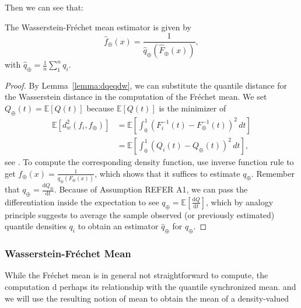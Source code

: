 Then we can see that:
\begin{lemma}
    The Wasserstein-Fréchet mean estimator is given by
    \begin{equation}
        \hat{f}_\oplus(x) = \frac{1}{\hat{q}_\oplus(\hat{F}_\oplus(x))},
    \end{equation}
    with $\hat{q}_\oplus = \frac{1}{n} \sum_{1}^{n} q_i$.
\end{lemma}
\begin{proof}
    By Lemma~\ref{lemma:dqeqdw}, we can substitute the quantile distance for the
    Wasserstein distance in the computation of the Fréchet mean. We set
    $Q_\oplus(t) = \mathbb{E}[Q(t)]$ because $\mathbb{E}[Q(t)]$ is the minimizer of
    \begin{equation}
    \label{eq:wf_mean}
        \begin{aligned}
            \mathbb{E}[d_w^2(f_i, f_\oplus)]	& =
            \mathbb{E}\left[\int_{0}^{1}(F_i^{-1}(t) - F_\oplus^{-1}(t))^2 \,dt\right] \\
                                    & =
            \mathbb{E}\left[\int_{0}^{1}(Q_i(t) - Q_\oplus(t))^2 \,dt\right],
        \end{aligned}
    \end{equation}
    see \citet[Chapter~3.1.4]{PanaretosZemel2020}. To compute the corresponding density
    function, use inverse function rule to get
    $f_\oplus(x) = \frac{1}{q_\oplus(F_\oplus(x))}$, which shows that it suffices to
    estimate $q_\oplus$. Remember that
    $q_\oplus = \frac{\mathrm{d}Q_\oplus}{\mathrm{d}t}$. Because of Assumption REFER A1,
    we can pass the differentiation inside the expectation to see
    $q_\oplus = \mathbb{E}\left[\frac{\mathrm{d}Q}{\mathrm{d}t}\right]$, which by analogy
    principle suggests to average the sample observed (or previously estimated)
    quantile densities $q_i$ to obtain an estimator $\hat{q}_\oplus$ for $q_\oplus$.
\end{proof}


\subsubsection{Wasserstein-Fréchet Mean}
\label{sec:wasserstein_f_mean}
While the Fréchet mean is in general not straightforward to compute, the computation
d perhaps its relationship with the quantile synchronized mean.
and we will use the resulting notion of mean to obtain the mean of a density-valued
